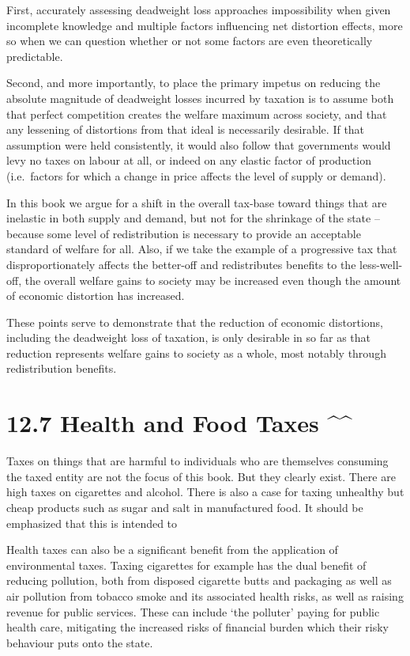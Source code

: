 \documentclass[]{tufte-handout}
\begin{document}
First, accurately assessing deadweight loss approaches impossibility
when given incomplete knowledge and multiple factors influencing net
distortion effects, more so when we can question whether or not some
factors are even theoretically predictable.

Second, and more importantly, to place the primary impetus on reducing
the absolute magnitude of deadweight losses incurred by taxation is to
assume both that perfect competition creates the welfare maximum across
society, and that any lessening of distortions from that ideal is
necessarily desirable. If that assumption were held consistently, it
would also follow that governments would levy no taxes on labour at all,
or indeed on any elastic factor of production (i.e.~factors for which a
change in price affects the level of supply or demand).

In this book we argue for a shift in the overall tax-base toward things
that are inelastic in both supply and demand, but not for the shrinkage
of the state -- because some level of redistribution is necessary to
provide an acceptable standard of welfare for all. Also, if we take the
example of a progressive tax that disproportionately affects the
better-off and redistributes benefits to the less-well-off, the overall
welfare gains to society may be increased even though the amount of
economic distortion has increased.

These points serve to demonstrate that the reduction of economic
distortions, including the deadweight loss of taxation, is only
desirable in so far as that reduction represents welfare gains to
society as a whole, most notably through redistribution benefits.

\hypertarget{health-and-food-taxes}{%
\section{12.7 Health and Food Taxes
\^{}\^{}}\label{health-and-food-taxes}}

Taxes on things that are harmful to individuals who are themselves
consuming the taxed entity are not the focus of this book. But they
clearly exist. There are high taxes on cigarettes and alcohol. There is
also a case for taxing unhealthy but cheap products such as sugar and
salt in manufactured food. It should be emphasized that this is intended
to

Health taxes can also be a significant benefit from the application of
environmental taxes. Taxing cigarettes for example has the dual benefit
of reducing pollution, both from disposed cigarette butts and packaging
as well as air pollution from tobacco smoke and its associated health
risks, as well as raising revenue for public services. These can include
`the polluter' paying for public health care, mitigating the increased
risks of financial burden which their risky behaviour puts onto the
state.
\end{document}
